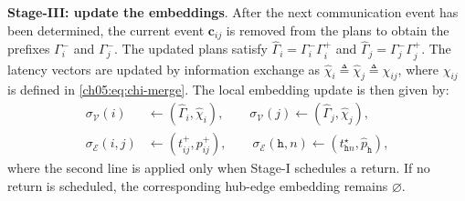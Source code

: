 \textbf{Stage-III: update the embeddings}.
After the next communication event has been determined, the current event
$\mathbf{c}_{ij}$ is removed from the plans to obtain the prefixes
$\Gamma_i^{-}$ and $\Gamma_j^{-}$. The updated plans satisfy
$\widehat{\Gamma}_i = \Gamma_i^{-}\Gamma_i^{+}$ and
$\widehat{\Gamma}_j = \Gamma_j^{-}\Gamma_j^{+}$. The latency vectors are
updated by information exchange as
$\widehat{\chi}_i \triangleq \widehat{\chi}_j \triangleq \chi_{ij}$, where
$\chi_{ij}$ is defined in \eqref{ch05:eq:chi-merge}. The local embedding update
is then given by:
\begin{equation}
\begin{aligned}
\sigma_{\mathcal{V}}(i) &\leftarrow
(\widehat{\Gamma}_i, \widehat{\chi}_i), \qquad
\sigma_{\mathcal{V}}(j) \leftarrow
(\widehat{\Gamma}_j, \widehat{\chi}_j), \\
\sigma_{\mathcal{E}}(i,j) &\leftarrow (t_{ij}^{+}, p_{ij}^{+}), \qquad
\sigma_{\mathcal{E}}(\texttt{h}, n) \leftarrow
(t_{\texttt{h}n}^{\star}, \widehat{p}_{\texttt{h}}),
\end{aligned}
\label{ch05:eq:embed-update}
\end{equation}
where the second line is applied only when Stage-I schedules a return. If no
return is scheduled, the corresponding hub-edge embedding remains
$\varnothing$.



